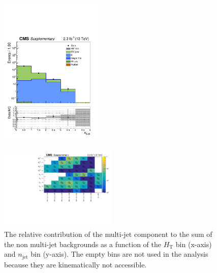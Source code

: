 \begin{figure}[tbhp]
\begin{center}
     \includegraphics[width=0.45\textwidth]{DoubleMu_nBJet40_all_all_aux} \\
  \end{center}
\end{figure}


\clearpage
\begin{figure}[tbhp]
    \caption{ 
    The relative contribution of the multi-jet component to the sum of the non multi-jet backgrounds 
    as a function of the $H_{\mathrm{T}}$ bin (x-axis) and $n_{\mathrm{jet}}$ bin (y-axis). 
    The empty bins are not used in the analysis because they are kinematically not accessible. 
    \label{fig:qcd-rel-cont} }
  \begin{center}
     \includegraphics[width=0.5\textwidth]{QCDRelCont_aux}
  \end{center}
\end{figure}



